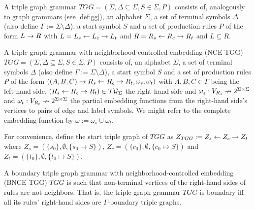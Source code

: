 \documentclass[]{report}
\begin{document}
\begin{definition}
	A triple graph grammar $TGG = (\Sigma, \Delta \subseteq \Sigma, S \in \Sigma, P)$ consists of, analogously to graph grammars (see \ref{def:gg}), an alphabet $\Sigma$, a set of terminal symbols $\Delta$ (also define $\Gamma := \Sigma \setminus \Delta$), a start symbol $S$ and a set of production rules $P$ of the form $L \to R$ with $L = L_s \overset{}{\leftarrow} L_c \overset{}{\rightarrow} L_t$ and $R = R_s \overset{}{\leftarrow} R_c \overset{}{\rightarrow} R_t$ and $L \subseteq R.$
\end{definition}

\begin{definition}
	A triple graph grammar with neighborhood-controlled embedding (NCE TGG) $TGG = (\Sigma, \Delta \subseteq \Sigma, S \in \Sigma, P)$ consists of, an alphabet $\Sigma$, a set of terminal symbols $\Delta$ (also define $\Gamma := \Sigma \setminus \Delta$), a start symbol $S$ and a set of production rules $P$ of the form $((A,B,C) \to R_s \overset{}{\leftarrow} R_c \overset{}{\rightarrow} R_t, \omega_s, \omega_t)$ with $A,B,C \in \Gamma$ being the left-hand side, $(R_s \overset{}{\leftarrow} R_c \overset{}{\rightarrow} R_t) \in \mathcal{TG}_{\Sigma}$ the right-hand side and $\omega_s : V_{R_s} \nrightarrow 2^{\Sigma \times \Sigma}$ and $\omega_t : V_{R_t} \nrightarrow 2^{\Sigma \times \Sigma}$ the partial embedding functions from the right-hand side's vertices to pairs of edge and label symbols. We might refer to the complete embedding function by $\omega:= \omega_s \cup \omega_t$.
	
	For convenience, define the start triple graph of $TGG$ as $Z_{TGG} := Z_s \overset{}{\leftarrow} Z_c \overset{}{\rightarrow} Z_t$ where $Z_s = (\{s_0\},\emptyset,\{s_0 \mapsto S\})$, $Z_c = (\{c_0\},\emptyset,\{c_0 \mapsto S\})$ and $Z_t = (\{t_0\},\emptyset,\{t_0 \mapsto S\})$.
	
\end{definition}

\begin{definition}
	A boundary triple graph grammar with neighborhood-controlled embedding (BNCE TGG) $TGG$ is such that non-terminal vertices of the right-hand sides of rules are not neighbors. That is, the triple graph grammar $TGG$ is boundary iff all its rules' right-hand sides are $\Gamma\text{-boundary}$ triple graphs.
\end{definition}

\end{document}
